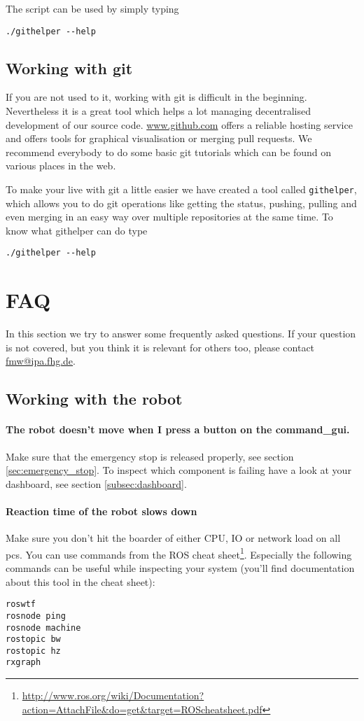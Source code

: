 The script can be used by simply typing
\begin{lstlisting}
./githelper --help
\end{lstlisting}

\subsection{Working with git}
If you are not used to it, working with git is difficult in the beginning. Nevertheless it is a great tool which helps a lot managing decentralised development of our source code. \url{www.github.com} offers a reliable hosting service and offers tools for graphical visualisation or merging pull requests. We recommend everybody to do some basic git tutorials which can be found on various places in the web.

To make your live with git a little easier we have created a tool called \texttt{githelper}, which allows you to do git operations like getting the status, pushing, pulling and even merging in an easy way over multiple repositories at the same time. To know what githelper can do type
\begin{lstlisting}
./githelper --help
\end{lstlisting}

\section{FAQ}
In this section we try to answer some frequently asked questions. If your question is not covered, but you think it is relevant for others too, please contact \href{mailto:fmw@ipa.fhg.de}{fmw@ipa.fhg.de}.

\subsection{Working with the robot}
\paragraph{The robot doesn't move when I press a button on the command\_gui.}
Make sure that the emergency stop is released properly, see section \ref{sec:emergency_stop}. To inspect which component is failing have a look at your dashboard, see section \ref{subsec:dashboard}.

\paragraph{Reaction time of the robot slows down}
Make sure you don't hit the boarder of either CPU, IO or network load on all pcs. You can use commands from the ROS cheat sheet\footnote{\url{http://www.ros.org/wiki/Documentation?action=AttachFile&do=get&target=ROScheatsheet.pdf}}. Especially the following commands can be useful while inspecting your system (you'll find documentation about this tool in the cheat sheet):
\begin{lstlisting}
roswtf
rosnode ping
rosnode machine
rostopic bw
rostopic hz
rxgraph 
\end{lstlisting}

